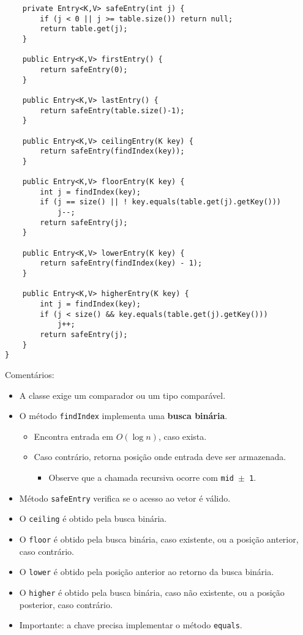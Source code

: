 \begin{verbatim}
	private Entry<K,V> safeEntry(int j) {
		if (j < 0 || j >= table.size()) return null;
		return table.get(j);
	}
	
	public Entry<K,V> firstEntry() {
		return safeEntry(0);
	}
	
	public Entry<K,V> lastEntry() {
		return safeEntry(table.size()-1);
	}
	
	public Entry<K,V> ceilingEntry(K key) {
		return safeEntry(findIndex(key));
	}
	
	public Entry<K,V> floorEntry(K key) {
		int j = findIndex(key);
		if (j == size() || ! key.equals(table.get(j).getKey()))
			j--;
		return safeEntry(j);
	}
	
	public Entry<K,V> lowerEntry(K key) {
		return safeEntry(findIndex(key) - 1);
	}
	
	public Entry<K,V> higherEntry(K key) {
		int j = findIndex(key);
		if (j < size() && key.equals(table.get(j).getKey()))
			j++;
		return safeEntry(j);
	}
}
\end{verbatim}

\clearpage

{\color{redtext}
Comentários:
\begin{itemize}
	\item A classe exige um comparador ou um tipo comparável.
	\item O método \texttt{findIndex} implementa uma \textbf{busca binária}.
	\begin{itemize}
		\item Encontra entrada em $O(\log n)$, caso exista.
		\item Caso contrário, retorna posição onde entrada deve ser armazenada.
		\begin{itemize}
			\item Observe que a chamada recursiva ocorre com \texttt{mid $\pm$ 1}.
		\end{itemize}
	\end{itemize}

	\item Método \texttt{safeEntry} verifica se o acesso ao vetor é válido.
	\item O \texttt{ceiling} é obtido pela busca binária.
	\item O \texttt{floor} é obtido pela busca binária, caso existente, ou a posição anterior, caso contrário.
	\item O \texttt{lower} é obtido pela posição anterior ao retorno da busca binária.
	\item O \texttt{higher} é obtido pela busca binária, caso não existente, ou a posição posterior, caso contrário.
	\item Importante: a chave precisa implementar o método \texttt{equals}.
\end{itemize}
}


